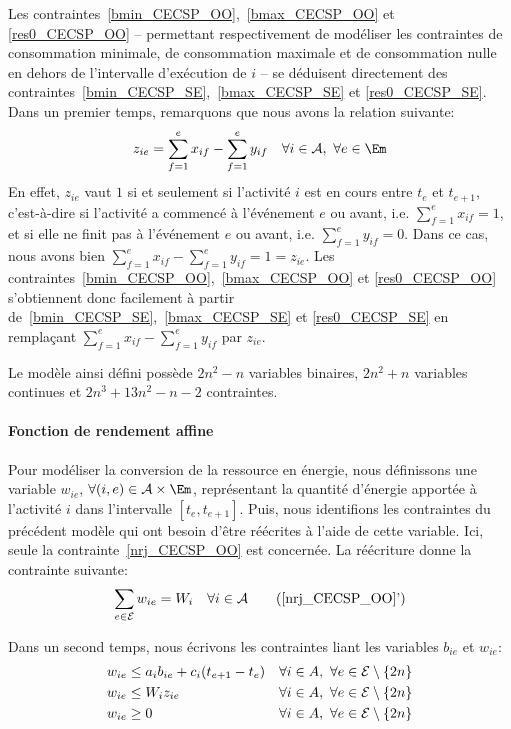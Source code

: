 Les contraintes~\eqref{bmin_CECSP_OO},~\eqref{bmax_CECSP_OO} et
\eqref{res0_CECSP_OO} -- permettant respectivement de modéliser les
contraintes de consommation minimale, de consommation maximale et de
consommation nulle en dehors de l'intervalle d'exécution de $i$ -- se
déduisent directement des
contraintes~\eqref{bmin_CECSP_SE},~\eqref{bmax_CECSP_SE} et
\eqref{res0_CECSP_SE}. Dans un premier temps, remarquons que nous
avons la relation suivante:
\begin{equation}
\label{SEversOO}
z_{ie} = \sum_{f=1}^e x_{if} -  \sum_{f=1}^e y_{if} \quad \forall i
\in \A,\ \forall e\in \Em
\end{equation}
En effet, $z_{ie}$ vaut $1$ si et seulement si l'activité $i$ est en
cours entre $t_e$ et $t_{e+1}$, c'est-à-dire si l'activité a commencé à
l'événement $e$ ou avant, i.e. $\sum_{f=1}^ex_{if}=1$, et si elle
ne finit pas à l'événement $e$ ou avant, i.e. $\sum_{f=1}^ey_{if}=
0$. Dans ce cas, nous avons bien $\sum_{f=1}^ex_{if} -
\sum_{f=1}^ey_{if}= 1 = z_{ie}$. Les
contraintes~\eqref{bmin_CECSP_OO},~\eqref{bmax_CECSP_OO} et
\eqref{res0_CECSP_OO} s'obtiennent donc facilement à partir
de~\eqref{bmin_CECSP_SE},~\eqref{bmax_CECSP_SE} et
\eqref{res0_CECSP_SE} en remplaçant $\sum_{f=1}^{e}
x_{if}-\sum_{f=1}^{e}y_{if}$ par $z_{ie}$.


Le modèle ainsi défini possède $2n^2-n$ variables binaires, $2n^2+n$
variables continues et $2n^3+13n^2-n-2$ contraintes.    

\paragraph{Fonction de rendement affine}

Pour modéliser la conversion de la ressource en énergie, nous
définissons une variable $w_{ie}$, $\forall (i,e) \in \A \times \Em$,
représentant la quantité d'énergie 
apportée à l'activité $i$ dans l'intervalle $[t_e,t_{e+1}]$. Puis,
nous identifions les contraintes du précédent modèle qui ont besoin
d'être réécrites à l'aide de cette variable. Ici, seule la
contrainte~\eqref{nrj_CECSP_OO} est concernée. La réécriture donne la
contrainte suivante:
\begin{equation}
\sum_{e\in \E} w_{ie}=W_i \quad \forall i \in \A
\tag{\ref{nrj_CECSP_OO}'}
\end{equation}

Dans un second temps, nous écrivons les contraintes liant les variables
$b_{ie}$ et $w_{ie}$:
\begin{align}
  &w_{ie} \le a_ib_{ie}+c_i(t_{e+1}-t_e) & & \forall i \in A,\ \forall
  e \in {\cal E} \setminus\{2n\} \label{conv1_CECSP_OO}\\
  &w_{ie} \le W_i z_{ie} & & \forall i \in A,\ \forall e \in
                             {\cal E}\setminus\{2n\} \label{conv2_CECSP_OO}\\ 
  & w_{ie} \ge 0 & & \forall i \in A,\ \forall e \in {\cal E}\setminus\{2n\}
  \label{Bw_CECSP_OO}
\end{align}

